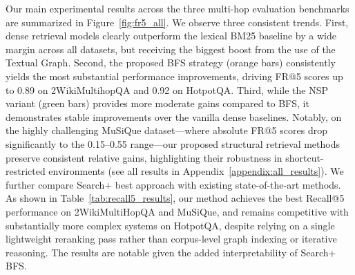 \documentclass[11pt]{article}
\begin{document}

Our main experimental results across the three multi-hop evaluation benchmarks are summarized in Figure~\ref{fig:fr5_all}. We observe three consistent trends. First, dense retrieval models clearly outperform the lexical BM25 baseline by a wide margin across all datasets, but receiving the biggest boost from the use of the Textual Graph. Second, the proposed BFS strategy (orange bars) consistently yields the most substantial performance improvements, driving FR@5 scores up to 0.89 on 2WikiMultihopQA and 0.92 on HotpotQA. Third, while the NSP variant (green bars) provides more moderate gains compared to BFS, it demonstrates stable improvements over the vanilla dense baselines. Notably, on the highly challenging MuSiQue dataset—where absolute FR@5 scores drop significantly to the 0.15–0.55 range—our proposed structural retrieval methods preserve consistent relative gains, highlighting their robustness in shortcut-restricted environments (see all results in Appendix~\ref{appendix:all_results}). We further compare Search+ best approach with existing state-of-the-art methods. As shown in Table~\ref{tab:recall5_results}, our method achieves the best Recall@5 performance on 2WikiMultiHopQA and MuSiQue, and remains competitive with substantially more complex systems on HotpotQA, despite relying on a single lightweight reranking pass rather than corpus-level graph indexing or iterative reasoning. The results are notable given the added interpretability of Search+ BFS.
\end{document}

